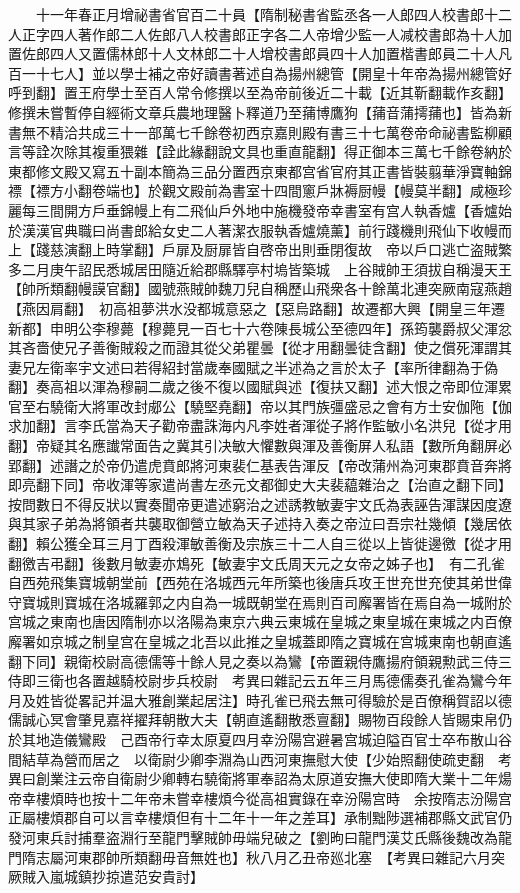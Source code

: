 　　十一年春正月增祕書省官百二十員【隋制秘書省監丞各一人郎四人校書郎十二人正字四人著作郎二人佐郎八人校書郎正字各二人帝增少監一人减校書郎為十人加置佐郎四人又置儒林郎十人文林郎二十人增校書郎員四十人加置楷書郎員二十人凡百一十七人】並以學士補之帝好讀書著述自為揚州總管【開皇十年帝為揚州總管好呼到翻】置王府學士至百人常令修撰以至為帝前後近二十載【近其靳翻載作亥翻】修撰未嘗暫停自經術文章兵農地理醫卜釋道乃至蒱博鷹狗【蒱音蒲摴蒱也】皆為新書無不精洽共成三十一部萬七千餘卷初西京嘉則殿有書三十七萬卷帝命祕書監柳顧言等詮次除其複重猥雜【詮此緣翻說文具也重直龍翻】得正御本三萬七千餘卷納於東都修文殿又寫五十副本簡為三品分置西京東都宫省官府其正書皆裝翦華淨寶軸錦褾【褾方小翻卷端也】於觀文殿前為書室十四間窻戶牀褥厨幔【幔莫半翻】咸極珍麗每三間開方戶垂錦幔上有二飛仙戶外地中施機發帝幸書室有宫人執香爐【香爐始於漢漢官典職曰尚書郎給女史二人著潔衣服執香爐燒薰】前行踐機則飛仙下收幔而上【踐慈演翻上時掌翻】戶扉及厨扉皆自啓帝出則垂閉復故　帝以戶口逃亡盗賊繁多二月庚午詔民悉城居田隨近給郡縣驛亭村塢皆築城　上谷賊帥王須拔自稱漫天王【帥所類翻幔謨官翻】國號燕賊帥魏刀兒自稱歷山飛衆各十餘萬北連突厥南寇燕趙【燕因肩翻】　初高祖夢洪水没都城意惡之【惡烏路翻】故遷都大興【開皇三年遷新都】申明公李穆薨【穆薨見一百七十六卷陳長城公至德四年】孫筠襲爵叔父渾忿其吝嗇使兄子善衡賊殺之而證其從父弟瞿曇【從才用翻曇徒含翻】使之償死渾謂其妻兄左衛率宇文述曰若得紹封當歲奉國賦之半述為之言於太子【率所律翻為于偽翻】奏高祖以渾為穆嗣二歲之後不復以國賦與述【復扶又翻】述大恨之帝即位渾累官至右驍衛大將軍改封郕公【驍堅堯翻】帝以其門族彊盛忌之會有方士安伽陁【伽求加翻】言李氏當為天子勸帝盡誅海内凡李姓者渾從子將作監敏小名洪兒【從才用翻】帝疑其名應䜟常面告之冀其引决敏大懼數與渾及善衡屏人私語【數所角翻屏必郢翻】述譖之於帝仍遣虎賁郎將河東裴仁基表告渾反【帝改蒲州為河東郡賁音奔將即亮翻下同】帝收渾等家遣尚書左丞元文都御史大夫裴藴雜治之【治直之翻下同】按問數日不得反狀以實奏聞帝更遣述窮治之述誘教敏妻宇文氏為表誣告渾謀因度遼與其家子弟為將領者共襲取御營立敏為天子述持入奏之帝泣曰吾宗社幾傾【幾居依翻】賴公獲全耳三月丁酉殺渾敏善衡及宗族三十二人自三從以上皆徙邊徼【從才用翻徼吉弔翻】後數月敏妻亦鴆死【敏妻宇文氏周天元之女帝之姊子也】　有二孔雀自西苑飛集寶城朝堂前【西苑在洛城西元年所築也後唐兵攻王世充世充使其弟世偉守寶城則寶城在洛城羅郭之内自為一城既朝堂在焉則百司廨署皆在焉自為一城附於宫城之東南也唐因隋制亦以洛陽為東京六典云東城在皇城之東皇城在東城之内百僚廨署如京城之制皇宫在皇城之北吾以此推之皇城蓋即隋之寶城在宫城東南也朝直遙翻下同】親衛校尉高德儒等十餘人見之奏以為鸞【帝置親侍鷹揚府領親勲武三侍三侍即三衛也各置越騎校尉步兵校尉　考異曰雜記云五年三月馬德儒奏孔雀為鸞今年月及姓皆從畧記并温大雅創業起居注】時孔雀已飛去無可得驗於是百僚稱賀詔以德儒誠心冥會肇見嘉祥擢拜朝散大夫【朝直遙翻散悉亶翻】賜物百段餘人皆賜束帛仍於其地造儀鸞殿　己酉帝行幸太原夏四月幸汾陽宫避暑宫城迫隘百官士卒布散山谷間結草為營而居之　以衛尉少卿李淵為山西河東撫慰大使【少始照翻使疏吏翻　考異曰創業注云帝自衛尉少卿轉右驍衛將軍奉詔為太原道安撫大使即隋大業十二年煬帝幸樓煩時也按十二年帝未嘗幸樓煩今從高祖實錄在幸汾陽宫時　余按隋志汾陽宫正屬樓煩郡自可以言幸樓煩但有十二年十一年之差耳】承制黜陟選補郡縣文武官仍發河東兵討捕羣盗淵行至龍門擊賊帥毋端兒破之【劉昫曰龍門漢艾氏縣後魏改為龍門隋志屬河東郡帥所類翻毋音無姓也】秋八月乙丑帝廵北塞　【考異曰雜記六月突厥賊入嵐城鎮抄掠遣范安貴討】


